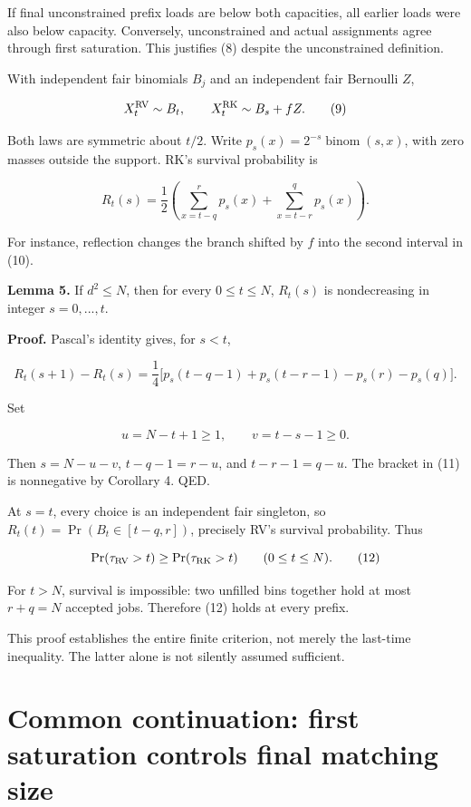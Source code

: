 If final unconstrained prefix loads are below both capacities, all earlier loads were also below capacity. Conversely, unconstrained and actual assignments agree through first saturation. This justifies (8) despite the unconstrained definition.

With independent fair binomials \(B_j\) and an independent fair Bernoulli \(Z\),

\[
X_t^{\rm RV}\sim B_t,\qquad X_t^{\rm RK}\sim B_s+fZ.\tag{9}
\]

Both laws are symmetric about \(t/2\). Write \(p_s(x)=2^{-s} \operatorname{binom}(s,x)\), with zero masses outside the support. RK's survival probability is

\[
R_t(s)=\frac12\left(
\sum_{x=t-q}^{r}p_s(x)
+\sum_{x=t-r}^{q}p_s(x)
\right).\tag{10}
\]

For instance, reflection changes the branch shifted by \(f\) into the second interval in (10).

\textbf{Lemma 5.} If \(d^2\le N\), then for every \(0\le t\le N\), \(R_t(s)\) is nondecreasing in integer \(s=0,...,t\).

\textbf{Proof.} Pascal's identity gives, for \(s<t\),

\[
R_t(s+1)-R_t(s)
=\frac14\bigl[p_s(t-q-1)+p_s(t-r-1)-p_s(r)-p_s(q)\bigr].\tag{11}
\]

Set

\[
u=N-t+1\ge1,\qquad v=t-s-1\ge0.
\]

Then \(s=N-u-v\), \(t-q-1=r-u\), and \(t-r-1=q-u\). The bracket in (11) is nonnegative by Corollary 4. QED.

At \(s=t\), every choice is an independent fair singleton, so \(R_t(t)=\Pr(B_t\in [t-q,r])\), precisely RV's survival probability. Thus

\[
\Pr(\tau_{\rm RV}>t)\ge\Pr(\tau_{\rm RK}>t)\qquad(0\le t\le N).\tag{12}
\]

For \(t>N\), survival is impossible: two unfilled bins together hold at most \(r+q=N\) accepted jobs. Therefore (12) holds at every prefix.

This proof establishes the entire finite criterion, not merely the last-time inequality. The latter alone is not silently assumed sufficient.

\section{Common continuation: first saturation controls final matching size}\label{common-continuation-first-saturation-controls-final-matching-size}


